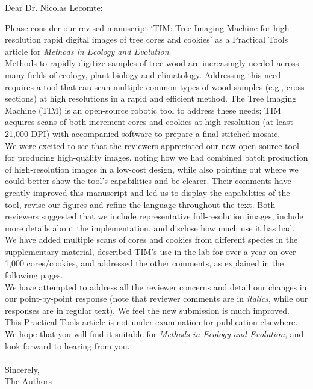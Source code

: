 \documentclass[11pt,a4paper]{letter}
\begin{document}
\begin{letter}{}

\opening{Dear Dr. Nicolas Lecomte:}

\noindent Please consider our revised manuscript `TIM: Tree Imaging Machine for high resolution rapid digital images of tree cores and cookies' as a Practical Tools article for \emph{Methods in Ecology and Evolution}. 
\vspace{1.5ex}\\
Methods to rapidly digitize samples of tree wood are increasingly needed across many fields of ecology, plant biology and climatology. Addressing this need requires a tool that can scan multiple common types of wood samples (e.g., cross-sections) at high resolutions in a rapid and efficient method. The Tree Imaging Machine (TIM) is an open-source robotic tool to address these needs; TIM acquires scans of both increment cores and cookies at high-resolution (at least 21,000 DPI) with accompanied software to prepare a final stitched mosaic. 
\vspace{1.5ex}\\
We were excited to see that the reviewers appreciated our new open-source tool for producing high-quality images, noting how we had combined batch production of high-resolution images in a low-cost design, while also pointing out where we could better show the tool's capabilities and be clearer. Their comments have greatly improved this manuscript and led us to display the capabilities of the tool, revise our figures and refine the language throughout the text. Both reviewers suggested that we include representative full-resolution images, include more details about the implementation, and disclose how much use it has had. We have added multiple scans of cores and cookies from different species in the supplementary material, described TIM's use in the lab for over a year on over 1,000 cores/cookies, and addressed the other comments, as explained in the following pages.   
\vspace{1.5ex}\\
We have attempted to address all the reviewer concerns and detail our changes in our point-by-point response (note that reviewer comments are in \emph{italics}, while our responses are in regular text). We feel the new submission is much improved. This Practical Tools article is not under examination for publication elsewhere. We hope that you will find it suitable for \emph{Methods in Ecology and Evolution}, and look forward to hearing from you.
\\\vspace{-1ex}\\
\noindent Sincerely,\\

 
\noindent The Authors


\end{letter}
\end{document}
